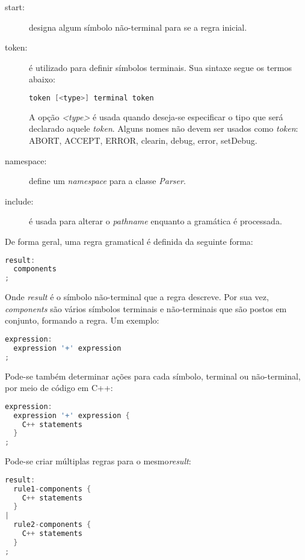 \begin{apendicesenv}
\begin{description}
\item[start:] designa algum símbolo não-terminal para se a regra inicial.
\item[token:] é utilizado para definir símbolos terminais. Sua sintaxe segue os termos abaixo:

\begin{lstlisting}[language=c,  caption=Sintaxe]
token [<type>] terminal token
\end{lstlisting}
A opção \textit{<type>} é usada quando deseja-se especificar o tipo que será declarado aquele \textit{token}. Alguns nomes não devem ser usados como \textit{token}: ABORT, ACCEPT, ERROR, clearin, debug, error, setDebug.
\item[namespace:] define um \textit{namespace} para a classe \textit{Parser}.
\item[include:] é usada para alterar o \textit{pathname} enquanto a gramática é processada.
\end{description}

De forma geral, uma regra gramatical é definida da seguinte forma:

\begin{lstlisting}[language=c,  caption=Definição de Regra Gramatical]
result:
  components
;
\end{lstlisting}

\par
\indent Onde \textit{result} é o símbolo não-terminal que a regra descreve. Por sua vez,  \textit{components} são vários símbolos terminais e não-terminais que são postos em conjunto, formando a regra. Um exemplo:
\begin{lstlisting}[language=c,  caption=Exemplo de Regra Gramatical]
expression:
  expression '+' expression
;
\end{lstlisting}

\par 
\indent Pode-se também determinar ações para cada símbolo, terminal ou não-terminal, por meio de código em C++:
\begin{lstlisting}[language=c,  caption=Exemplo de Regra Gramatical Utilizando C++]
expression:
  expression '+' expression {
    C++ statements
  }
;
\end{lstlisting}

\par 
\indent Pode-se criar múltiplas regras para o mesmo\textit{result}:

\begin{lstlisting}[language=c,  caption=Exemplo de Regra Gramatical Utilizando Múltiplas Regras]
result:
  rule1-components {
    C++ statements
  }
|
  rule2-components {
    C++ statements
  }
;
\end{lstlisting}


\end{apendicesenv}

